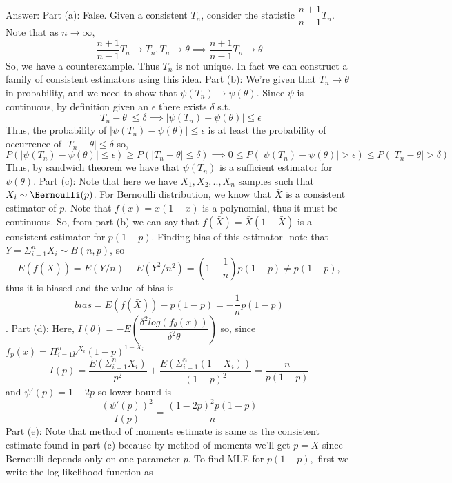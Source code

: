 \documentclass[12pt, oneside]{article}
\begin{document}
\begin{enumerate}
\begin{enumerate}
\end{enumerate}

Answer: 
\newline Part (a): False. Given a consistent $T_n$, consider the statistic $\dfrac{n+1}{n-1} T_n$. Note that as $n \to \infty,$ 
$$\dfrac{n+1}{n-1} T_n \to T_n, T_n \to \theta \implies \dfrac{n+1}{n-1} T_n \to \theta$$
So, we have a counterexample. Thus $T_n$ is not unique. In fact we can construct a family of consistent estimators using this idea.
\newline Part (b): We're given that $T_n \to \theta$ in probability, and we need to show that $\psi(T_n) \to \psi(\theta)$. Since $\psi$ is continuous, by definition given an $\epsilon$ there exists $\delta$ s.t. 
$$|T_n - \theta| \le \delta \implies |\psi(T_n)-\psi(\theta)| \le \epsilon$$
Thus, the probability of $|\psi(T_n)-\psi(\theta)| \le \epsilon$ is at least the probability of occurrence of $|T_n - \theta| \le \delta$ so, 
$$P(|\psi(T_n)-\psi(\theta)| \le \epsilon) \ge P(|T_n - \theta| \le \delta) \implies  0 \le P(|\psi(T_n)-\psi(\theta)| > \epsilon) \le P(|T_n - \theta| > \delta)$$
Thus, by sandwich theorem we have that $\psi(T_n)$ is a sufficient estimator for $\psi(\theta)$.
\newline Part (c): Note that here we have $X_1,X_2,..,X_n$ samples such that $X_i \sim \Bernoulli(p)$. For Bernoulli distribution, we know that $\bar{X}$ is a consistent estimator of $p$. Note that $f(x) = x(1-x)$ is a polynomial, thus it must be continuous. So, from part (b) we can say that $f(\bar{X}) = \bar{X} (1-\bar{X})$ is a consistent estimator for $p(1-p)$.
\newline Finding bias of this estimator- note that $Y = \Sigma_{i=1}^{n} X_i \sim B(n,p)$, so
$$E(f(\bar{X})) = E(Y/n) - E(Y^2/n^2) = (1-\dfrac{1}{n})p(1-p) \neq p(1-p),$$ thus it is biased and the value of bias is $$bias = E(f(\bar{X})) - p(1-p) = -\dfrac{1}{n}p(1-p)$$. 
\newline Part (d): Here, $I(\theta) = -E(\dfrac{\delta^2 log(f_{\theta}(x))}{\delta^2 \theta})$ so, since $f_{p} (x) = \Pi_{i=1}^{n} p^{X_i} (1-p)^{1-X_i}$
$$ I(p) = \dfrac{E(\Sigma_{i=1}^{n} X_i)}{p^2} + \dfrac{E(\Sigma_{i=1}^{n} (1-X_i))}{(1-p)^2} = \dfrac{n}{p(1-p)} 
$$
and $\psi'(p) = 1-2p$ so lower bound is $$
\dfrac{(\psi'(p))^2}{I(p)} = \dfrac{(1-2p)^2p(1-p)}{n}
$$
Part (e): Note that method of moments estimate is same as the consistent estimate found in part (c) because by method of moments we'll get $p = \bar{X}$ since Bernoulli depends only on one parameter $p$.
To find MLE for $p(1-p),$ first we write the log likelihood function as 

\end{enumerate}
\end{document}

